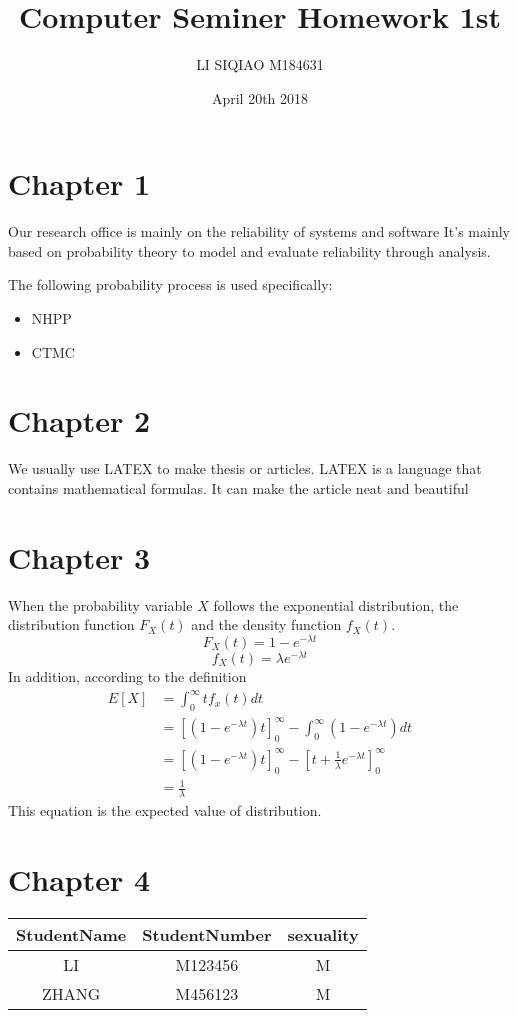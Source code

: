 \documentclass[a4paper,12pt]{article}
\title{Computer Seminer Homework 1st}
\author{LI SIQIAO M184631}
\date{April 20th 2018}
\begin{document}
\maketitle
\section{Chapter 1}
Our research office is mainly on the reliability of systems and software
It's mainly based on probability theory to model and evaluate reliability through analysis.
\par The following probability process is used specifically:

\begin{itemize}
\item NHPP
\item CTMC
\end{itemize}

\maketitle
\section{Chapter 2}
We usually use LATEX to make thesis or articles.
LATEX is a language that contains mathematical formulas.
It can make the article neat and beautiful 
\maketitle
\section{Chapter 3}
When the probability variable $X$ follows the exponential distribution, the distribution function $F_X(t)$ and the density function $f_X(t)$. 
\begin{equation}  
F_X(t)=1-e^{-\lambda t}
\end{equation}  
\begin{equation}  
f_X(t)=\lambda e^{-\lambda t}
\end{equation}  
In addition, according to the definition 
\begin{align}
E[X]&= \int_0^{\infty} t f_x(t) dt\nonumber\\
&=[(1-e^{-\lambda t}) t]^\infty_{0}-\int_0^{\infty}(1-e^{-\lambda t}) dt\nonumber\\
&=[(1-e^{-\lambda t}) t]^\infty_{0}-[t+\frac{1}{\lambda} e^{-\lambda t}]^\infty_{0}\nonumber\\
&=\frac{1}{\lambda}
\end{align}
This equation is the expected value of distribution.
\maketitle
\section{Chapter 4}
\begin{tabular}{|c|c|c|}
\toprule
StudentName&StudentNumber&sexuality\\
\midrule
LI&M123456&M\\
\midrule
ZHANG&M456123&M\\
\bottomrule
\end{tabular}
\end{document}
